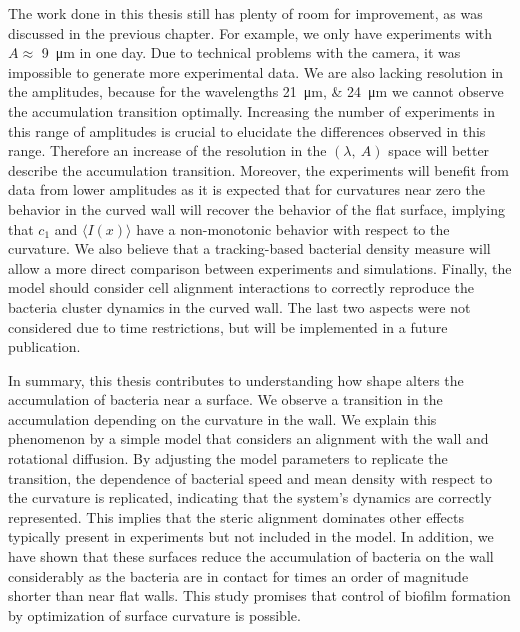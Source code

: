 The work done in this thesis still has plenty of room for improvement, as was discussed in the previous chapter. For example, we only have experiments with $A\approx$ \SI{9}{\micro\meter} in one day. Due to technical problems with the camera, it was impossible to generate more experimental data. We are also lacking resolution in the amplitudes, because for the wavelengths \SIlist{21;24}{\micro\meter} we cannot observe the accumulation transition optimally. Increasing the number of experiments in this range of amplitudes is crucial to elucidate the differences observed in this range. Therefore an increase of the resolution in the  $(\lambda, \ A)$ space will better describe the accumulation transition. Moreover, the experiments will benefit from data from lower amplitudes as it is expected that for curvatures near zero the behavior in the curved wall will recover the behavior of the flat surface, implying that $c_1$ and $\langle I(x) \rangle$ have a non-monotonic behavior with respect to the curvature. We also believe that a tracking-based bacterial density measure will allow a more direct comparison between experiments and simulations. Finally, the model should consider cell alignment interactions to correctly reproduce the bacteria cluster dynamics in the curved wall. The last two aspects were not considered due to time restrictions, but will be implemented in a future publication.

In summary, this thesis contributes to understanding how shape alters the accumulation of bacteria near a surface. We observe a transition in the accumulation depending on the curvature in the wall. We explain this phenomenon by a simple model that considers an alignment with the wall and rotational diffusion. By adjusting the model parameters to replicate the transition, the dependence of bacterial speed and mean density with respect to the curvature is replicated, indicating that the system's dynamics are correctly represented. This implies that the steric alignment dominates other effects typically present in experiments but not included in the model. In addition, we have shown that these surfaces reduce the accumulation of bacteria on the wall considerably as the bacteria are in contact for times an order of magnitude shorter than near flat walls. This study promises that control of biofilm formation by optimization of surface curvature is possible.
